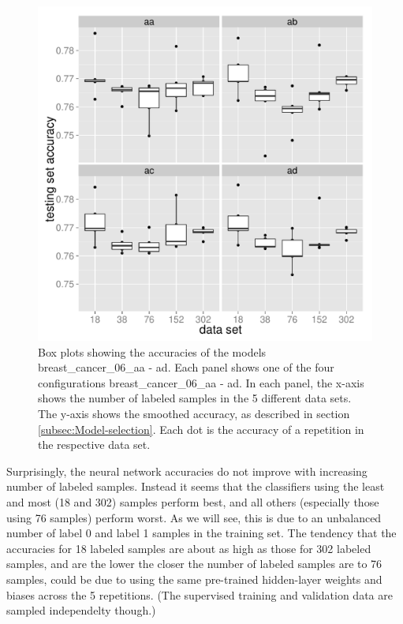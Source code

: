 \begin{figure}
\begin{centering}
\includegraphics[width=0.68\paperwidth]{images/breast_cancer_06-loess-aa_ad.pdf}
\par\end{centering}
\caption[Box plots showing the accuracies of the models breast\_cancer\_06\_aa
- ad.]{\label{fig:accuracy-plots-of-breast_cancer_06_aa-ad}Box plots showing
the accuracies of the models breast\_cancer\_06\_aa - ad. Each panel
shows one of the four configurations breast\_cancer\_06\_aa - ad.
In each panel, the x-axis shows the number of labeled samples in the
5 different data sets. The y-axis shows the smoothed accuracy, as
described in section \ref{subsec:Model-selection}. Each dot is the
accuracy of a repetition in the respective data set.}
\end{figure}

Surprisingly, the neural network accuracies do not improve with increasing
number of labeled samples. Instead it seems that the classifiers using
the least and most (18 and 302) samples perform best, and all others
(especially those using 76 samples) perform worst. As we will see,
this is due to an unbalanced number of label 0 and label 1 samples
in the training set. The tendency that the accuracies for 18 labeled
samples are about as high as those for 302 labeled samples, and are
the lower the closer the number of labeled samples are to 76 samples,
could be due to using the same pre-trained hidden-layer weights and
biases across the 5 repetitions. (The supervised training and validation
data are sampled independelty though.)

